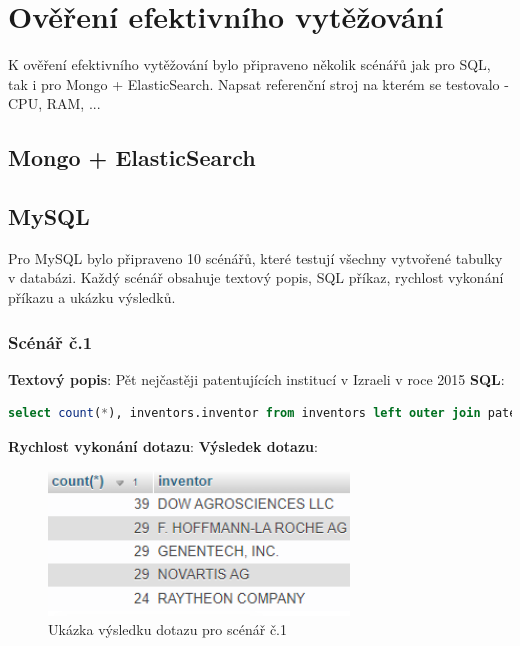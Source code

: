 
\chapter{Ověření efektivního vytěžování}
K ověření efektivního vytěžování bylo připraveno několik scénářů jak pro SQL, tak i pro Mongo + ElasticSearch.\newline
Napsat referenční stroj na kterém se testovalo - CPU, RAM, ...
\section{Mongo + ElasticSearch}
\section{MySQL}
Pro MySQL bylo připraveno 10 scénářů, které testují všechny vytvořené tabulky v databázi. Každý scénář obsahuje textový popis, SQL příkaz, rychlost vykonání příkazu a ukázku výsledků.

\subsection{Scénář č.1}
\textbf{Textový popis}: Pět nejčastěji patentujících institucí v Izraeli v roce 2015
\newline
\textbf{SQL}: 
\begin{lstlisting}[language=SQL, breaklines=true, frame=single, label = {lst:elements_a}, captionpos=b]
select count(*), inventors.inventor from inventors left outer join patents on inventors.id_patent = patents.id where YEAR(patents.patent_date) = 2015 and patents.patent_id like '%IL%' group by inventors.inventor order by count(*) desc LIMIT 5;
\end{lstlisting}
\textbf{Rychlost vykonání dotazu}: 
\newline
\textbf{Výsledek dotazu}:
\begin{figure}[h!]
\centering
\includegraphics[width=8cm]{img/scenare/scenar_1}
\caption{Ukázka výsledku dotazu pro scénář č.1}
\label{fig:scenar1}
\end{figure}


